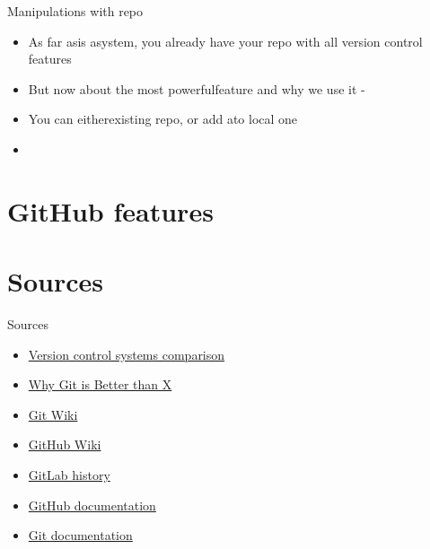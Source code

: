 \documentclass[usenames,dvipsnames,10pt,aspectratio=169]{beamer}
\begin{document}


\begin{frame}[fragile]{Manipulations with repo}
    \begin{itemize}
        \item As far asis asystem, you already have your repo with all version control features
        \item But now about the most powerfulfeature and why we use it -
        \item You can eitherexisting repo, or add ato local one
        \item 
    \end{itemize}
\end{frame}

\section{GitHub features}


\section{Sources}
\begin{frame}{Sources}
    \begin{itemize}
       \item \href{https://en.wikipedia.org/wiki/Comparison_of_version-control_software}{Version control systems comparison}
       \item \href{https://translatedby.com/you/why-git-is-better-than-x/original/}{Why Git is Better than X}
       \item \href{https://en.wikipedia.org/wiki/Git}{Git Wiki}
       \item \href{https://en.wikipedia.org/wiki/GitHub}{GitHub Wiki}
       \item \href{https://about.gitlab.com/company/history/}{GitLab history}
       \item \href{https://docs.github.com/en}{GitHub documentation}
       \item \href{https://git-scm.com/}{Git documentation}
    \end{itemize}
\end{frame}
\end{document}
